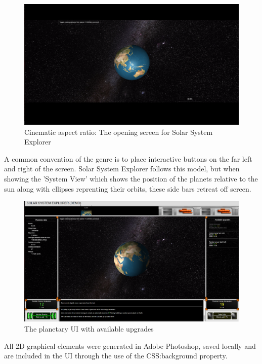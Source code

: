 \documentclass[twoside]{bhamthesis}
\begin{document}
\begin{figure}[h!]
  \includegraphics[width=\linewidth]{images/cinematic.png}
  \caption{Cinematic aspect ratio: The opening screen for Solar System Explorer}
  \label{fig:cinematic}
\end{figure}

A common convention of the genre is to place interactive buttons on the far left and right of the screen. Solar System Explorer follows this model, but when showing the 'System View' which shows the position of the planets relative to the sun along with ellipses reprenting their orbits, these side bars retreat off screen.

\begin{figure}[h!]
  \includegraphics[width=\linewidth]{images/ui_upgrades.png}
  \caption{The planetary UI with available upgrades}
  \label{fig:ui_upgrades}
\end{figure}

All 2D graphical elements were generated in Adobe Photoshop, saved locally and are included in the UI through the use of the CSS:background property.
\end{document}
